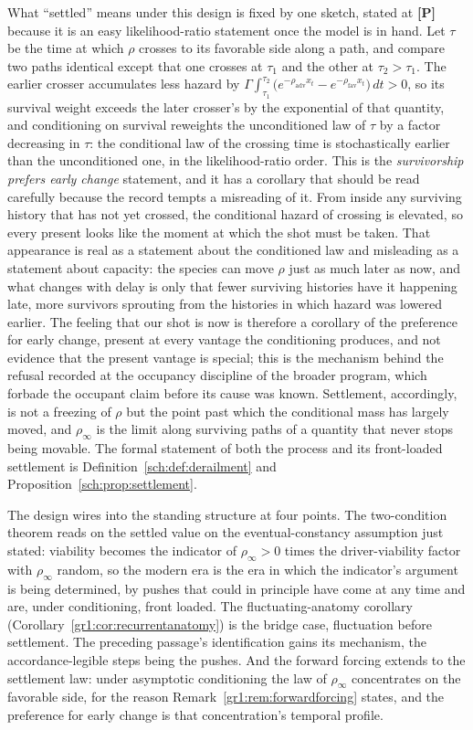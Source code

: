 What ``settled'' means under this design is fixed by one sketch,
stated at \textbf{[P]} because it is an easy likelihood-ratio
statement once the model is in hand. Let $\tau$ be the time at which
$\rho$ crosses to its favorable side along a path, and compare two
paths identical except that one crosses at $\tau_1$ and the other at
$\tau_2>\tau_1$. The earlier crosser accumulates less hazard by
$\Gamma\!\int_{\tau_1}^{\tau_2}\bigl(e^{-\rho_{\mathrm{adv}}x_t}
-e^{-\rho_{\mathrm{fav}}x_t}\bigr)\,dt>0$, so its survival weight
exceeds the later crosser's by the exponential of that quantity, and
conditioning on survival reweights the unconditioned law of $\tau$
by a factor decreasing in $\tau$: the conditional law of the
crossing time is stochastically earlier than the unconditioned one,
in the likelihood-ratio order. This is the \emph{survivorship prefers
early change} statement, and it has a corollary that should be read
carefully because the record tempts a misreading of it. From inside
any surviving history that has not yet crossed, the conditional
hazard of crossing is elevated, so every present looks like the
moment at which the shot must be taken. That appearance is real as a
statement about the conditioned law and misleading as a statement
about capacity: the species can move $\rho$ just as much later as
now, and what changes with delay is only that fewer surviving
histories have it happening late, more survivors sprouting from the
histories in which hazard was lowered earlier. The feeling that our
shot is now is therefore a corollary of the preference for early
change, present at every vantage the conditioning produces, and not
evidence that the present vantage is special; this is the mechanism
behind the refusal recorded at the occupancy discipline of the broader program,
which forbade the occupant claim before its cause was known.
Settlement, accordingly, is not a freezing of $\rho$ but the point
past which the conditional mass has largely moved, and $\rho_\infty$
is the limit along surviving paths of a quantity that never stops
being movable. The formal statement of both the process and its
front-loaded settlement is Definition~\ref{sch:def:derailment} and
Proposition~\ref{sch:prop:settlement}.

The design wires into the standing structure at four points. The two-condition theorem reads on the settled value on the eventual-constancy assumption just stated: viability becomes the indicator of $\rho_\infty>0$ times the driver-viability factor with $\rho_\infty$ random, so the modern era is the era in which the indicator's argument is being determined, by pushes that could in
principle have come at any time and are, under conditioning, front
loaded. The fluctuating-anatomy corollary
(Corollary~\ref{gr1:cor:recurrentanatomy}) is the bridge case,
fluctuation before settlement. The preceding passage's
identification gains its mechanism, the accordance-legible steps
being the pushes. And the forward forcing extends to the settlement
law: under asymptotic conditioning the law of $\rho_\infty$
concentrates on the favorable side, for the reason
Remark~\ref{gr1:rem:forwardforcing} states, and the preference for
early change is that concentration's temporal profile.

